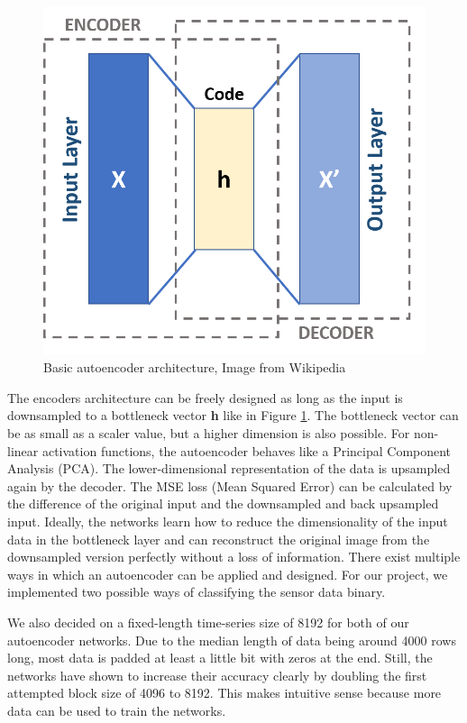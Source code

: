 \documentclass[journal]{IEEEtran}
\begin{document}
\begin{figure}
\centering
\includegraphics[width=1\linewidth]{../imgs/autoencoder}
\caption{Basic autoencoder architecture, Image from Wikipedia}
\label{fig:autoencoder}
\end{figure}

The encoders architecture can be freely designed as long as the input is downsampled to a bottleneck vector \textbf{h} like in Figure \ref{fig:autoencoder}. The bottleneck vector can be as small as a scaler value, but a higher dimension is also possible. For non-linear activation functions, the autoencoder behaves like a Principal Component Analysis (PCA).
The lower-dimensional representation of the data is upsampled again by the decoder. The MSE loss (Mean Squared Error) can be calculated by the difference of the original input and the downsampled and back upsampled input. Ideally, the networks learn how to reduce the dimensionality of the input data in the bottleneck layer and can reconstruct the original image from the downsampled version perfectly without a loss of information.
There exist multiple ways in which an autoencoder can be applied and designed. For our project, we implemented two possible ways of classifying the sensor data binary.

We also decided on a fixed-length time-series size of 8192 for both of our autoencoder networks. Due to the median length of data being around 4000 rows long, most data is padded at least a little bit with zeros at the end. Still, the networks have shown to increase their accuracy clearly by doubling the first attempted block size of 4096 to 8192. This makes intuitive sense because more data can be used to train the networks.
\end{document}
